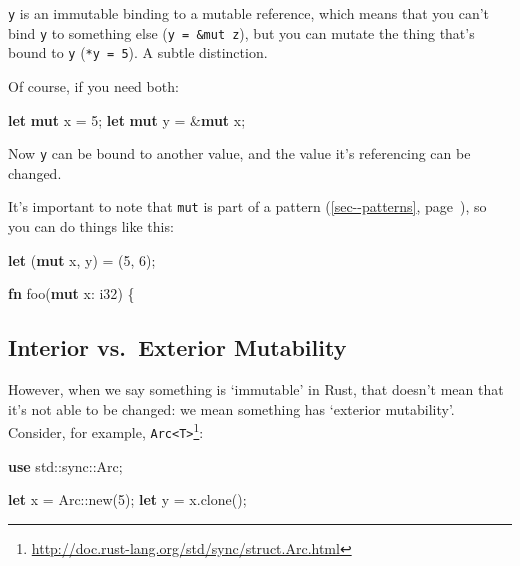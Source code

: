 \documentclass[a4paper,]{book}
\renewcommand*{\hyperref}[2][\ar]{%
  \def\ar{#2}%
  #2 (\autoref{#1}, page~\pageref{#1})}
\newenvironment{Shaded}{\begin{snugshade}}{\end{snugshade}}
\newcommand{\KeywordTok}[1]{\textcolor[rgb]{0.13,0.29,0.53}{\textbf{{#1}}}}
\newcommand{\DataTypeTok}[1]{\textcolor[rgb]{0.13,0.29,0.53}{{#1}}}
\newcommand{\DecValTok}[1]{\textcolor[rgb]{0.00,0.00,0.81}{{#1}}}
\newcommand{\NormalTok}[1]{{#1}}
\renewcommand{\href}[2]{#2\footnote{\url{#1}}}
\begin{document}
\texttt{y} is an immutable binding to a mutable reference, which means
that you can't bind \texttt{y} to something else
(\texttt{y\ =\ \&mut\ z}), but you can mutate the thing that's bound to
\texttt{y} (\texttt{*y\ =\ 5}). A subtle distinction.

Of course, if you need both:

\begin{Shaded}
\begin{Highlighting}[]
\KeywordTok{let} \KeywordTok{mut} \NormalTok{x = }\DecValTok{5}\NormalTok{;}
\KeywordTok{let} \KeywordTok{mut} \NormalTok{y = &}\KeywordTok{mut} \NormalTok{x;}
\end{Highlighting}
\end{Shaded}

Now \texttt{y} can be bound to another value, and the value it's
referencing can be changed.

It's important to note that \texttt{mut} is part of a
\hyperref[sec--patterns]{pattern}, so you can do things like this:

\begin{Shaded}
\begin{Highlighting}[]
\KeywordTok{let} \NormalTok{(}\KeywordTok{mut} \NormalTok{x, y) = (}\DecValTok{5}\NormalTok{, }\DecValTok{6}\NormalTok{);}

\KeywordTok{fn} \NormalTok{foo(}\KeywordTok{mut} \NormalTok{x: }\DataTypeTok{i32}\NormalTok{) \{}
\end{Highlighting}
\end{Shaded}

\subsection{Interior vs.~Exterior
Mutability}\label{interior-vs.exterior-mutability}

However, when we say something is `immutable' in Rust, that doesn't mean
that it's not able to be changed: we mean something has `exterior
mutability'. Consider, for example,
\href{http://doc.rust-lang.org/std/sync/struct.Arc.html}{\texttt{Arc\textless{}T\textgreater{}}}:

\begin{Shaded}
\begin{Highlighting}[]
\KeywordTok{use} \NormalTok{std::sync::Arc;}

\KeywordTok{let} \NormalTok{x = Arc::new(}\DecValTok{5}\NormalTok{);}
\KeywordTok{let} \NormalTok{y = x.clone();}
\end{Highlighting}
\end{Shaded}
\end{document}

